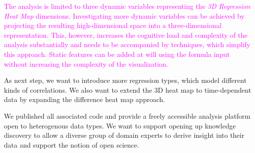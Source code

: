 \documentclass[journal]{style/vgtc} 			          %
\newcommand{\magenta}[1]{\textcolor{magenta}{#1}}
\begin{document}
\magenta{
The analysis is limited to three dynamic variables representing the \emph{3D Regression Heat Map} dimensions.
Investigating more dynamic variables can be achieved by projecting the resulting high-dimensional space into a three-dimensional representation.
This, however, increases the cognitive load and complexity of the analysis substantially and needs to be accompanied by techniques, which simplify this approach.
Static features can be added at will using the formula input without increasing the complexity of the visualization.
}

As next step, we want to introduce more regression types, which model different kinds of correlations.
We also want to extend the 3D heat map to time-dependent data by expanding the difference heat map approach.

We published all associated code and provide a freely accessible analysis platform open to heterogenous data types.
We want to support opening up knowledge discovery to allow a diverse group of domain experts to derive insight into their data and support the notion of open science.
\begin{small}
\end{small}
\clearpage
\newpage


\end{document}
